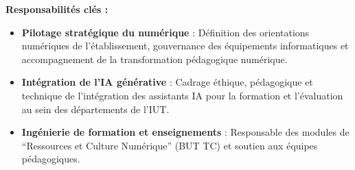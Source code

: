 \textbf{Responsabilités clés :}
\begin{itemize}[leftmargin=*]
    \item \textbf{Pilotage stratégique du numérique} : Définition des orientations numériques de l'établissement, gouvernance des équipements informatiques et accompagnement de la transformation pédagogique numérique.
    \item \textbf{Intégration de l'IA générative} : Cadrage éthique, pédagogique et technique de l'intégration des assistants IA pour la formation et l'évaluation au sein des départements de l'IUT.
    \item \textbf{Ingénierie de formation et enseignements} : Responsable des modules de \enquote{Ressources et Culture Numérique} (BUT TC) et soutien aux équipes pédagogiques.
\end{itemize}